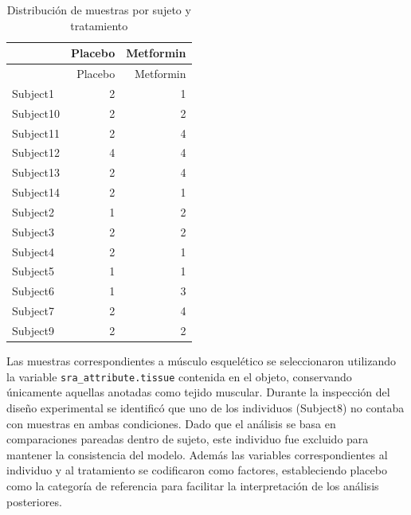 \documentclass[
  spanish,
  11pt,
]{article}
\newenvironment{Shaded}{\begin{snugshade}}{\end{snugshade}}
\newcommand{\AttributeTok}[1]{\textcolor[rgb]{0.13,0.29,0.53}{#1}}
\newcommand{\CommentTok}[1]{\textcolor[rgb]{0.56,0.35,0.01}{\textit{#1}}}
\newcommand{\DecValTok}[1]{\textcolor[rgb]{0.00,0.00,0.81}{#1}}
\newcommand{\FunctionTok}[1]{\textcolor[rgb]{0.13,0.29,0.53}{\textbf{#1}}}
\newcommand{\NormalTok}[1]{#1}
\newcommand{\OtherTok}[1]{\textcolor[rgb]{0.56,0.35,0.01}{#1}}
\newcommand{\SpecialCharTok}[1]{\textcolor[rgb]{0.81,0.36,0.00}{\textbf{#1}}}
\newcommand{\StringTok}[1]{\textcolor[rgb]{0.31,0.60,0.02}{#1}}
\begin{document}
\begin{Shaded}
\end{Shaded}

\begin{longtable}[]{@{}lrr@{}}
\caption{Distribución de muestras por sujeto y
tratamiento}\tabularnewline
\toprule\noalign{}
& Placebo & Metformin \\
\midrule\noalign{}
\endfirsthead
\toprule\noalign{}
& Placebo & Metformin \\
\midrule\noalign{}
\endhead
\bottomrule\noalign{}
\endlastfoot
Subject1 & 2 & 1 \\
Subject10 & 2 & 2 \\
Subject11 & 2 & 4 \\
Subject12 & 4 & 4 \\
Subject13 & 2 & 4 \\
Subject14 & 2 & 1 \\
Subject2 & 1 & 2 \\
Subject3 & 2 & 2 \\
Subject4 & 2 & 1 \\
Subject5 & 1 & 1 \\
Subject6 & 1 & 3 \\
Subject7 & 2 & 4 \\
Subject9 & 2 & 2 \\
\end{longtable}

Las muestras correspondientes a músculo esquelético se seleccionaron
utilizando la variable \texttt{sra\_attribute.tissue} contenida en el
objeto, conservando únicamente aquellas anotadas como tejido muscular.
Durante la inspección del diseño experimental se identificó que uno de
los individuos (Subject8) no contaba con muestras en ambas condiciones.
Dado que el análisis se basa en comparaciones pareadas dentro de sujeto,
este individuo fue excluido para mantener la consistencia del modelo.
Además las variables correspondientes al individuo y al tratamiento se
codificaron como factores, estableciendo placebo como la categoría de
referencia para facilitar la interpretación de los análisis posteriores.
\end{document}
